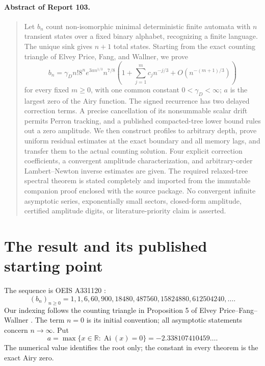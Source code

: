 \documentclass[11pt,letterpaper]{article}
\numberwithin{equation}{section}
\theoremstyle{remark}
\newcommand{\Ai}{\operatorname{Ai}}
\begin{document}
\paragraph{Abstract of Report 103.}
\begin{quote}\small
Let $b_n$ count non-isomorphic minimal deterministic finite automata with $n$ transient states over a fixed binary alphabet, recognizing a finite language. The unique sink gives $n+1$ total states. Starting from the exact counting triangle of Elvey Price, Fang, and Wallner, we prove
\[
 b_n=\gamma_D n!8^n e^{3an^{1/3}}n^{7/8}
 \left(1+\sum_{j=1}^{m}c_jn^{-j/3}+O(n^{-(m+1)/3})\right)
\]
for every fixed $m\ge0$, with one common constant $0<\gamma_D<\infty$; $a$ is the largest zero of the Airy function. The signed recurrence has two delayed correction terms. A precise cancellation of its nonsummable scalar drift permits Perron tracking, and a published compacted-tree lower bound rules out a zero amplitude. We then construct profiles to arbitrary depth, prove uniform residual estimates at the exact boundary and all memory lags, and transfer them to the actual counting solution. Four explicit correction coefficients, a convergent amplitude characterization, and arbitrary-order Lambert--Newton inverse estimates are given. The required relaxed-tree spectral theorem is stated completely and imported from the immutable companion proof enclosed with the source package. No convergent infinite asymptotic series, exponentially small sectors, closed-form amplitude, certified amplitude digits, or literature-priority claim is asserted.
\end{quote}

\section{The result and its published starting point}\label{air:jp:dfa:sec:result}
The sequence is OEIS A331120 \cite{oeis}:
\[
 (b_n)_{n\ge0}=1,1,6,60,900,18480,487560,15824880,612504240,\ldots.
\]
Our indexing follows the counting triangle in Proposition 5 of Elvey Price--Fang--Wallner \cite{dfa}. The term $n=0$ is its initial convention; all asymptotic statements concern $n\to\infty$. Put
\[
 a=\max\{x\in\mathbb R:\Ai(x)=0\}=-2.338107410459\ldots.
\]
The numerical value identifies the root only; the constant in every theorem is the exact Airy zero.
\end{document}
